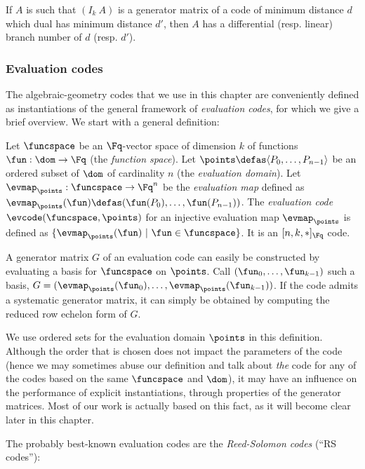 If $A$ is such that $(I_k~A)$ is a generator matrix of a code of minimum distance $d$ which dual has minimum distance $d'$,
then $A$ has a differential (resp. linear) branch number of $d$ (resp. $d'$).

\subsubsection{Evaluation codes}

The algebraic-geometry codes that we use in this chapter are conveniently defined as instantiations of the general framework of \emph{evaluation codes}, for which
we give a brief overview.
We start with a general definition:

\begin{defi}
Let $\funcspace$ be an $\Fq$-vector space of dimension $k$ of functions $\fun : \dom \rightarrow \Fq$ (the \emph{function space}). Let $\points \defas \langle P_0,\ldots, P_{n-1}\rangle$
be an ordered subset of $\dom$ of cardinality $n$ (the \emph{evaluation domain}). Let $\evmap_\points : \funcspace \rightarrow \Fq^n$ be the \emph{evaluation map}
defined as $\evmap_\points(\fun) \defas (\fun(P_0),\ldots,\fun(P_{n-1}))$.
The \emph{evaluation code} $\evcode(\funcspace,\points)$ for an injective evaluation map $\evmap_\points$ is defined as $\{\evmap_\points(\fun)~|~\fun \in \funcspace\}$.
It is an $[n,k,\ast]_{\Fq}$ code.
\end{defi}

A generator matrix $G$ of an evaluation code can easily be constructed by evaluating a basis for $\funcspace$ on $\points$. Call $(\fun_0,\ldots,\fun_{k-1})$
such a basis, $G = (\evmap_\points(\fun_0),\ldots,\evmap_\points(\fun_{k-1}))$.
If the code admits a systematic generator matrix, it can simply be obtained by computing the reduced row echelon form of $G$.

We use ordered sets for the evaluation domain $\points$ in this definition. Although the order that is chosen does not impact the parameters of the code (hence we
may sometimes abuse our definition and talk about \emph{the} code for any of the codes based on the same $\funcspace$ and $\dom$), it may have
an influence on the performance of explicit instantiations, through \eg properties of the generator matrices. Most of our work is actually based on this fact,
as it will become clear later in this chapter. 

The probably best-known evaluation codes are the \emph{Reed-Solomon codes} (``RS codes''):

